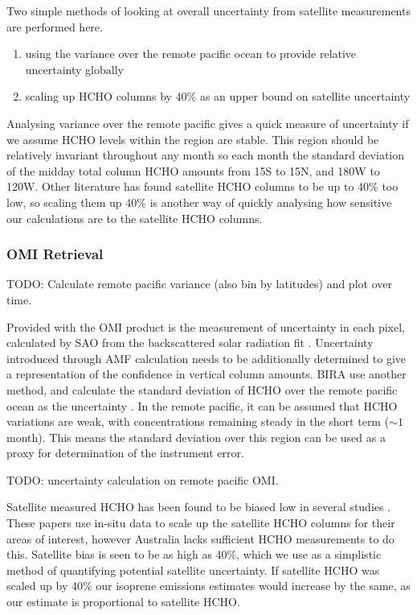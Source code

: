     
    Two simple methods of looking at overall uncertainty from satellite measurements are performed here.
    \begin{enumerate}
      \item using the variance over the remote pacific ocean to provide relative uncertainty globally \parencite[e.g.][]{DeSmedt2012}
      \item scaling up HCHO columns by 40\% as an upper bound on satellite uncertainty
    \end{enumerate}
    Analysing variance over the remote pacific gives a quick measure of uncertainty if we assume HCHO levels within the region are stable.
    This region should be relatively invariant throughout any month so each month the standard deviation of the midday total column HCHO amounts from 15\degr S to 15\degr N, and 180\degr W to 120\degr W.
    Other literature has found satellite HCHO columns to be up to 40\% too low, so scaling them up 40\% is another way of quickly analysing how sensitive our calculations are to the satellite HCHO columns.
    
    
    \subsubsection{OMI Retrieval}
      \label{BioIsop:uncertainty:Satellite:retrieval}
      TODO: Calculate remote pacific variance (also bin by latitudes) and plot over time. 
      
      
      Provided with the OMI product is the measurement of uncertainty in each pixel, calculated by SAO from the backscattered solar radiation fit \parencite{Abad2015,Abad2016}.
      Uncertainty introduced through AMF calculation needs to be additionally determined to give a representation of the confidence in vertical column amounts.
      BIRA use another method, and calculate the standard deviation of HCHO over the remote pacific ocean as the uncertainty \parencite{DeSmedt2012, DeSmedt2015}.
      In the remote pacific, it can be assumed that HCHO variations are weak, with concentrations remaining steady in the short term ($\sim 1$ month).
      This means the standard deviation over this region can be used as a proxy for determination of the instrument error.
      
      
      TODO: uncertainty calculation on remote pacific OMI.
      
      Satellite measured HCHO has been found to be biased low in several studies \parencite[eg.][]{Zhu2016,DeSmedt2015,Barkley2013}.
      These papers use in-situ data to scale up the satellite HCHO columns for their areas of interest, however Australia lacks sufficient HCHO measurements to do this.
      Satellite bias is seen to be as high as 40\%, which we use as a simplistic method of quantifying potential satellite uncertainty.
      If satellite HCHO was scaled up by 40\% our isoprene emissions estimates would increase by the same, as our estimate is proportional to satellite HCHO.
      
